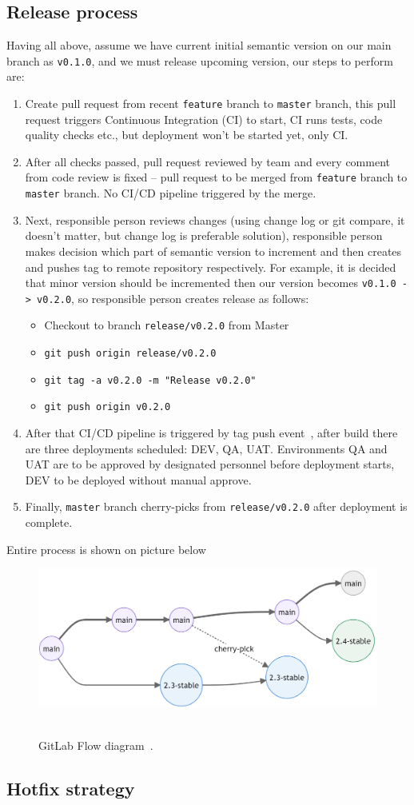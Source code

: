 \subsection{Release process}
Having all above, assume we have current initial semantic version on our main branch as \texttt{v0.1.0},
and we must release upcoming version, our steps to perform are:
\begin{enumerate}
    \item Create pull request from recent \texttt{feature} branch to \texttt{master} branch, this pull request triggers
    Continuous Integration (CI) to start, CI runs tests, code quality checks etc.,
    but deployment won't be started yet, only CI\@.
    \item After all checks passed, pull request reviewed by team and every comment from code review is fixed -- pull
    request to be merged from \texttt{feature} branch to \texttt{master} branch.
    No CI/CD pipeline triggered by the merge.
    \item Next, responsible person reviews changes
    (using change log or git compare, it doesn't matter, but change log is preferable solution),
    responsible person makes decision which part of semantic version to increment and then creates
    and pushes tag to remote repository respectively.
    For example, it is decided that minor version should be incremented then our version becomes
    \texttt{v0.1.0 -> v0.2.0}, so responsible person creates release as follows:
    \begin{itemize}
        \item Checkout to branch \texttt{release/v0.2.0} from Master
        \item \texttt{git push origin release/v0.2.0}
        \item \texttt{git tag -a v0.2.0 -m "Release v0.2.0"}
        \item \texttt{git push origin v0.2.0}
    \end{itemize}
    \item After that CI/CD pipeline is triggered by tag push event~\cite{AzurePipelinesTriggers},
    after build there are three deployments scheduled: DEV, QA, UAT\@.
    Environments QA and UAT are to be approved by designated personnel before deployment starts,
    DEV to be deployed without manual approve.
    \item Finally, \texttt{master} branch cherry-picks from \texttt{release/v0.2.0} after deployment is complete.
\end{enumerate}
Entire process is shown on picture below
\begin{figure}[H]
    \centering
    \includegraphics[width=1\textwidth]{../img/GitLab_Flow}
    ~\caption{GitLab Flow diagram~\cite{GitLabFlow}.}
\end{figure}
\subsection{Hotfix strategy}